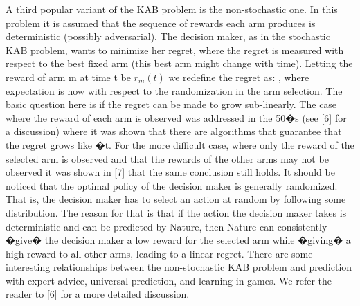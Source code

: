 A third popular variant of the KAB problem is the non-stochastic one. In this problem it is assumed that the sequence of rewards each arm produces is deterministic (possibly adversarial). The decision maker, as in the stochastic KAB problem, wants to minimize her regret, where the regret is measured with respect to the best fixed arm (this best arm might change with time). Letting the reward of arm m at time t be $r_m(t)$ we redefine the regret as:
,
where expectation is now with respect to the randomization in the arm selection. The basic question here is if the regret can be made to grow sub-linearly. The case where the reward of each arm is observed was addressed in the 50�s (see [6] for a discussion) where it was shown that there are algorithms that guarantee that the regret grows like �t. For the more difficult case, where only the reward of the selected arm is observed and that the rewards of the other arms may not be observed it was shown in [7] that the same conclusion still holds.
It should be noticed that the optimal policy of the decision maker is generally randomized. That is, the decision maker has to select an action at random by following some distribution. The reason for that is that if the action the decision maker takes is deterministic and can be predicted by Nature, then Nature can consistently �give� the decision maker a low reward for the selected arm while �giving� a high reward to all other arms, leading to a linear regret.
There are some interesting relationships between the non-stochastic KAB problem and prediction with expert advice, universal prediction, and learning in games. We refer the reader to [6] for a more detailed discussion.


